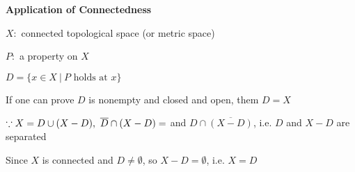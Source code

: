 \textbf{Application of Connectedness}

$X:$ connected topological space (or metric space)

$P:$ a property on $X$

$D = \{x \in X ~|~ P \text{ holds at } x\}$

If one can prove $D$ is nonempty and closed and open, them $D = X$

$\because X = D \cup (X - D),~\overline{D} \cap (X - D) = \empty$ and $D \cap \overline{(X-D)}$, i.e. $D$ and $X-D$ are separated

Since $X$ is connected and $D \neq \emptyset$, so $X-D = \emptyset$, i.e. $X = D$ 






